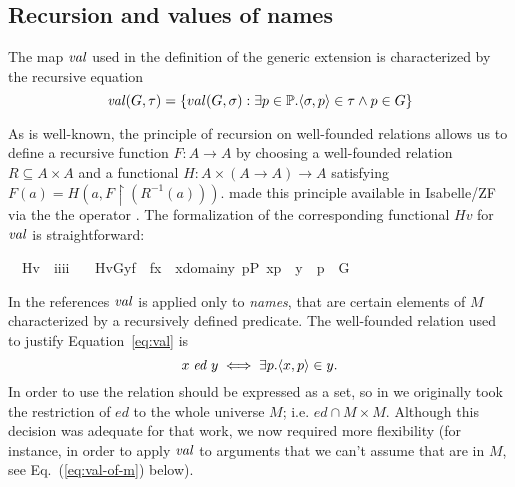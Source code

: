 \subsection*{Recursion and values of names}

The map $\operatorname{\mathit{val}}$ used in the definition of the generic extension is
characterized by the recursive equation
\begin{equation}
  \label{eq:val}
  \val(G,\tau) = \{val(G,\sigma) :\exists p \in\PP .%
  \lb\sigma,p\rb \in \tau \wedge p \in G \}
\end{equation}

As is well-known, the principle of  recursion on
well-founded relations \cite[p.~48]{kunen2011set} allows us to define
a recursive function $F \colon A\to A$ by choosing a well-founded
relation $R \subseteq A\times A$ and a functional
$H\colon A\times (A \to A) \to A$ satisfying
$F(a)=H(a,F\!\upharpoonright\!(R^{-1}(a)))$. \citet{paulson1995set}
made this principle available in Isabelle/ZF via the the operator
. The formalization of the corresponding functional
$\mathit{Hv}$ for $\operatorname{\mathit{val}}$ is straightforward:
%
\begin{isabelle}
\isamarkupfalse%
\isanewline
\ \ Hv\ {\isacharcolon}{\isacharcolon}\ {\isachardoublequoteopen}i{\isasymRightarrow}i{\isasymRightarrow}i{\isasymRightarrow}i{\isachardoublequoteclose}\ \isanewline
\ \ {\isachardoublequoteopen}Hv{\isacharparenleft}G{\isacharcomma}y{\isacharcomma}f{\isacharparenright}\ {\isacharequal}{\isacharequal}\ {\isacharbraceleft}f{\isacharbackquote}x\ {\isachardot}{\isachardot}\ x{\isasymin}domain{\isacharparenleft}y{\isacharparenright}{\isacharcomma}\ {\isasymexists}p{\isasymin}P{\isachardot}\ {\isacharless}x{\isacharcomma}p{\isachargreater}\ {\isasymin}\ y\ {\isasymand}\ p\ {\isasymin}\ G\ {\isacharbraceright}{\isachardoublequoteclose}
\end{isabelle}
In the references \cite{kunen2011set,weaver2014forcing} $\operatorname{\mathit{val}}$ is
applied only to \emph{names}, that are certain elements of $M$
characterized by a recursively defined predicate. The well-founded
relation used to justify Equation~\eqref{eq:val} is
\[ x \mathrel{\mathit{ed}} y \iff \exists p . \langle x,p\rangle\in y. \] In
order to use  the relation should be expressed as a set, so
in \cite{2018arXiv180705174G} we originally took the restriction of
$\mathit{ed}$ to the whole universe 
$M$; i.e. $\mathit{ed}\cap M\times M$.  Although this decision was
adequate for that work, we now required more flexibility (for
instance, in order to apply $\operatorname{\mathit{val}}$ to arguments that we can't assume
that are in $M$, see Eq.~(\ref{eq:val-of-m}) below).


